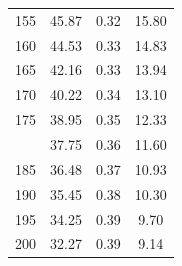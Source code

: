 \documentclass[12pt]{article}
\begin{document}
\begin{minipage}{0.5\textwidth}
\begin{tabular}{rccc}
    155 & 45.87 & 0.32 & 15.80 \\ 
    160 & 44.53 & 0.33 & 14.83 \\ 
    165 & 42.16 & 0.33 & 13.94 \\ 
    170 & 40.22 & 0.34 & 13.10 \\ 
    175 & 38.95 & 0.35 & 12.33 \\  \addlinespace
    180 & 37.75 & 0.36 & 11.60 \\ 
    185 & 36.48 & 0.37 & 10.93 \\ 
    190 & 35.45 & 0.38 & 10.30 \\ 
    195 & 34.25 & 0.39 & 9.70 \\ 
    200 & 32.27 & 0.39 & 9.14 \\ 

\bottomrule
\end{tabular}

\end{minipage} \hfill
\end{document}
